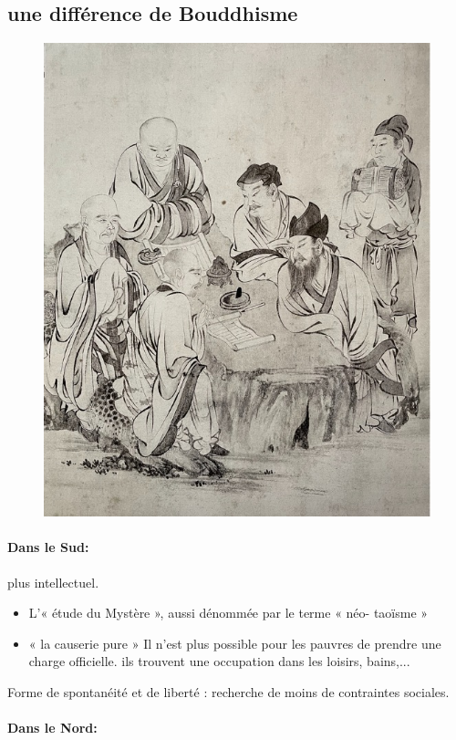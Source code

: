 \subsection{une différence de Bouddhisme}
\begin{figure}[!h]
    \centering
    \includegraphics[width=.5\textwidth]{ConfucianismeTaoismeBouddhismeChinois/Images/causeriesud.jpg}

    \label{fig:enter-label}
\end{figure}

\paragraph{Dans le Sud:} plus intellectuel.

\begin{itemize}
    \item L’« étude du Mystère », aussi dénommée par le terme « néo- taoïsme »
    \item « la causerie pure »
 Il n'est plus possible pour les pauvres de prendre une charge officielle. ils trouvent une occupation dans les loisirs, bains,...
\end{itemize}



 Forme de spontanéité et de liberté : recherche de moins de contraintes sociales. 

\textit{}


 \paragraph{Dans le Nord:}




